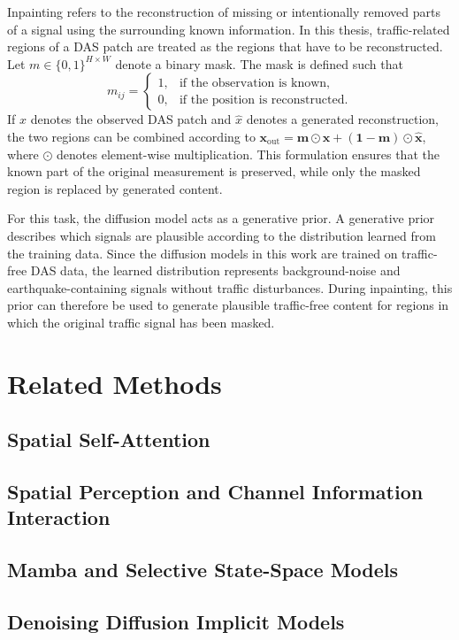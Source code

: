 \documentclass[english,ba]{tudo-sse-thesis}
\begin{document}
Inpainting refers to the reconstruction of missing or intentionally
removed parts of a signal using the surrounding known information. In
this thesis, traffic-related regions of a DAS patch are treated as the
regions that have to be reconstructed.
Let \(m \in \{0,1\}^{H \times W}\) denote a binary mask. The mask is
defined such that
\[
m_{ij}
=
\begin{cases}
    1, & \text{if the observation is known},\\
    0, & \text{if the position is reconstructed}.
\end{cases}
\]
If \(x\) denotes the observed DAS patch and \(\hat{x}\) denotes a
generated reconstruction, the two regions can be combined according to
\(\boldsymbol{x_{\mathrm{out}} = m \odot x + (1-m)\odot\hat{x}}\),
where \(\odot\) denotes element-wise multiplication.
This formulation ensures that the known part of the original
measurement is preserved, while only the masked region is replaced by
generated content.

For this task, the diffusion model acts as a generative prior. A
generative prior describes which signals are plausible according to the
distribution learned from the training data. Since the diffusion models
in this work are trained on traffic-free DAS data, the learned
distribution represents background-noise and earthquake-containing
signals without traffic disturbances.
During inpainting, this prior can therefore be used to generate plausible
traffic-free content for regions in which the original traffic signal has
been masked.

\chapter{Related Methods}

\section{Spatial Self-Attention}

\section{Spatial Perception and Channel Information Interaction}

\section{Mamba and Selective State-Space Models}

\section{Denoising Diffusion Implicit Models}
\end{document}
